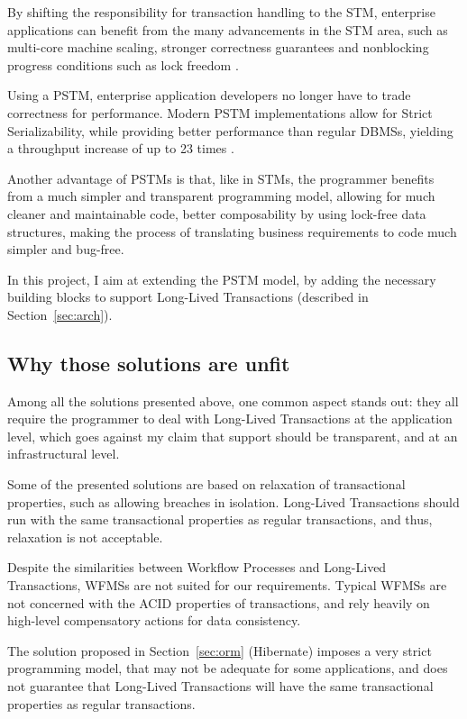 \documentclass{llncs}
\begin{document}
By shifting the responsibility for transaction handling to the STM,
enterprise applications can benefit from the many advancements in the
STM area, such as multi-core machine scaling, stronger correctness
guarantees and nonblocking progress conditions such as lock freedom
\cite{fernandes2011lock}.

Using a PSTM, enterprise application developers no longer have to
trade correctness for performance. Modern PSTM implementations allow
for Strict Serializability, while providing better performance than
regular DBMSs, yielding a throughput increase of up to 23 times
\cite{fernandes2011strict}.

Another advantage of PSTMs is that, like in STMs, the programmer
benefits from a much simpler and transparent programming model,
allowing for much cleaner and maintainable code, better composability
by using lock-free data structures, making the process of translating
business requirements to code much simpler and bug-free.

In this project, I aim at extending the PSTM model, by adding the
necessary building blocks to support Long-Lived Transactions
(described in Section~\ref{sec:arch}).

\subsection{Why those solutions are unfit}

Among all the solutions presented above, one common aspect stands out:
they all require the programmer to deal with Long-Lived Transactions
at the application level, which goes against my claim that support
should be transparent, and at an infrastructural level.

Some of the presented solutions are based on relaxation of
transactional properties, such as allowing breaches in
isolation. Long-Lived Transactions should run with the same
transactional properties as regular transactions, and thus, relaxation
is not acceptable.

Despite the similarities between Workflow Processes and Long-Lived
Transactions, WFMSs are not suited for our requirements. Typical WFMSs
are not concerned with the ACID properties of transactions, and rely
heavily on high-level compensatory actions for data consistency.

The solution proposed in Section~\ref{sec:orm} (Hibernate) imposes a
very strict programming model, that may not be adequate for some
applications, and does not guarantee that Long-Lived Transactions will
have the same transactional properties as regular transactions.
\end{document}
